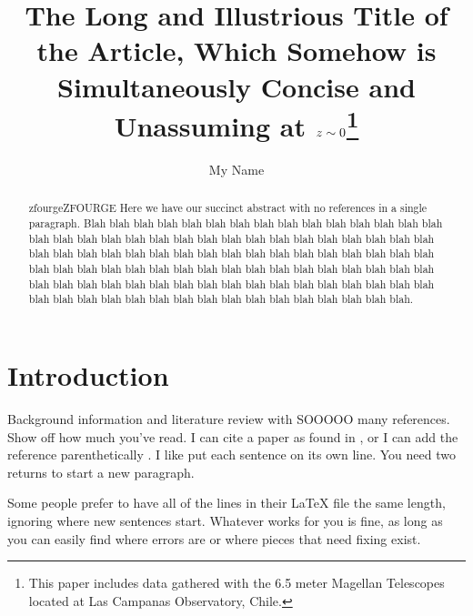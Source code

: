 \documentclass[twocolumn]{aastex61}
\newcommand{\zfourge}{{\sc zfourge}}
\begin{document}
\title{The Long and Illustrious Title of the Article, Which Somehow is Simultaneously Concise and Unassuming at $\MakeLowercase{z} \sim 0$\footnote{This paper includes data gathered with the 6.5 meter Magellan Telescopes located at Las Campanas Observatory, Chile.}}

\correspondingauthor{}

\author{My Name}



\begin{abstract}

\zfourge ZFOURGE
Here we have our succinct abstract with no references in a single paragraph.
Blah blah blah blah blah blah blah blah blah blah blah blah blah blah blah blah blah blah blah blah blah blah blah blah blah blah blah blah blah blah blah blah blah blah blah blah blah blah blah blah blah blah blah blah blah blah blah blah blah blah blah blah blah blah blah blah blah blah blah blah blah blah blah blah blah blah blah blah blah blah blah blah blah blah blah blah blah blah blah blah blah blah blah blah blah blah blah blah blah blah blah blah blah blah blah blah blah blah blah.

\end{abstract}




\section{Introduction}


Background information and literature review with SOOOOO many references. 
Show off how much you've read.
I can cite a paper as found in \citet{Straatman2016}, or I can add the reference parenthetically \citep[e.g.,][hereafter F16]{Alcorn2016, Forrest2016}.
I like put each sentence on its own line.
You need two returns to start a new paragraph.

Some people prefer to have all of the lines in their 
LaTeX file the same length, ignoring where new
sentences start.  Whatever works for you is fine, as
long as you can easily find where errors are or
where pieces that need fixing exist.
\end{document}
